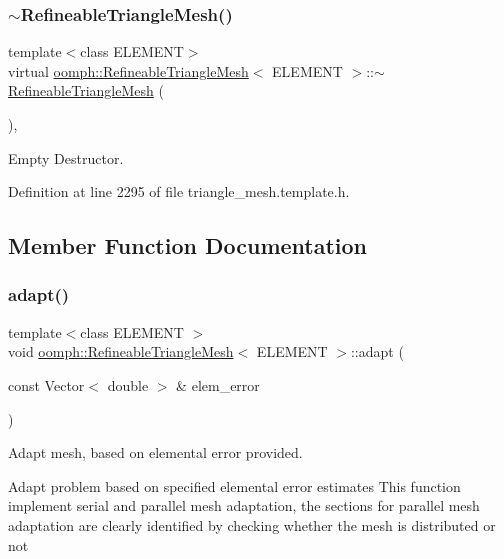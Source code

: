 \subsubsection{\texorpdfstring{$\sim$\+Refineable\+Triangle\+Mesh()}{~RefineableTriangleMesh()}}
{\footnotesize\ttfamily template$<$class E\+L\+E\+M\+E\+NT$>$ \\
virtual \hyperlink{classoomph_1_1RefineableTriangleMesh}{oomph\+::\+Refineable\+Triangle\+Mesh}$<$ E\+L\+E\+M\+E\+NT $>$\+::$\sim$\hyperlink{classoomph_1_1RefineableTriangleMesh}{Refineable\+Triangle\+Mesh} (\begin{DoxyParamCaption}{ }\end{DoxyParamCaption})\hspace{0.3cm}{\ttfamily [inline]}, {\ttfamily [virtual]}}



Empty Destructor. 



Definition at line 2295 of file triangle\+\_\+mesh.\+template.\+h.



\subsection{Member Function Documentation}
\mbox{\label{classoomph_1_1RefineableTriangleMesh_affc156d32aa40f84479e223f1217ebed}} 
\subsubsection{\texorpdfstring{adapt()}{adapt()}}
{\footnotesize\ttfamily template$<$class E\+L\+E\+M\+E\+NT $>$ \\
void \hyperlink{classoomph_1_1RefineableTriangleMesh}{oomph\+::\+Refineable\+Triangle\+Mesh}$<$ E\+L\+E\+M\+E\+NT $>$\+::adapt (\begin{DoxyParamCaption}\item[{const Vector$<$ double $>$ \&}]{elem\+\_\+error }\end{DoxyParamCaption})}



Adapt mesh, based on elemental error provided. 

Adapt problem based on specified elemental error estimates This function implement serial and parallel mesh adaptation, the sections for parallel mesh adaptation are clearly identified by checking whether the mesh is distributed or not 

